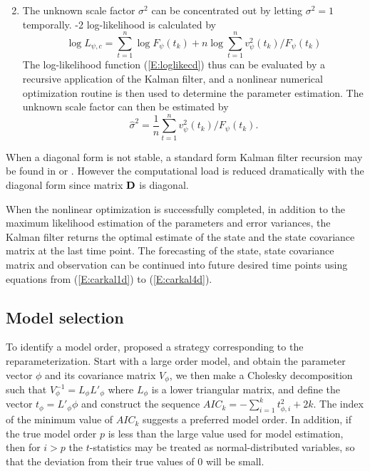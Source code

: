 \begin{enumerate}
\begin{equation}
    \end{equation}
    \item %
 The unknown scale factor $\sigma^2$ can be concentrated out by letting $\sigma^2=1$ temporally. %
-2 log-likelihood is calculated by
    \begin{equation}\label{E:loglikecd}
    \log L_{\psi,c}=\sum_{t=1}^{n}\log F_\psi(t_k)+n\log \sum_{t=1}^{n}v_\psi^2(t_k)/F_\psi(t_k)
    \end{equation}
    The log-likelihood function (\ref{E:loglikecd}) thus can be evaluated by a recursive application of the Kalman filter, and a nonlinear numerical optimization routine is then used to determine the parameter estimation. 
The unknown scale factor can then be estimated by
    \begin{equation}
    \hat{\sigma}^2=\frac{1}{n}\sum_{t=1}^{n}v_\psi^2(t_k)/F_\psi(t_k).
    \end{equation}
    \end{enumerate}
When a diagonal form is not stable, a standard form Kalman filter recursion may be found in \citet{Belc:Hamp:Tunn:1994} or \citet{Wang:2004}.
However the computational load is reduced dramatically with the diagonal form since matrix $\bold{D}$ is diagonal. 

When the nonlinear optimization is successfully completed, in addition to the maximum likelihood estimation of the parameters and error variances, the Kalman filter returns the optimal estimate of the state and the state covariance matrix at the last time point. The forecasting of the state, state covariance matrix and observation can be continued into future desired time points using equations from (\ref{E:carkal1d}) to (\ref{E:carkal4d}).
\subsection{Model selection}\label{S:caraic}

To identify a model order, \citet{Belc:Hamp:Tunn:1994} proposed a strategy corresponding to the reparameterization. Start with a large order model, and obtain the parameter vector $\phi$ and its covariance matrix $V_\phi$, we then make a Cholesky decomposition such that $V^{-1}_\phi=L_\phi L'_\phi$ where $L_\phi$ is a lower triangular matrix, and define the vector $t_\phi=L'_\phi \phi$ and construct the sequence $AIC_k=-\sum_{i=1}^{k}t^2_{\phi,i}+2k$. The index of the minimum value of $AIC_k$ suggests a preferred model order. In addition, if the true model order $p$ is less than the large value used for model estimation, then for $i>p$ the $t$-statistics may be treated as normal-distributed variables, so that the deviation from their true values of 0 will be small. 

